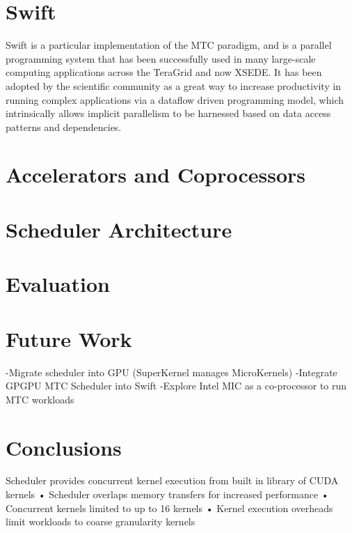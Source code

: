 \documentclass[conference]{IEEEtran}
\begin{document}
\section{Swift}
Swift is a particular implementation of the MTC paradigm, and is a parallel programming system that has been successfully used in many large-scale computing applications across the TeraGrid and now XSEDE. It has been adopted by the scientific community as a great way to increase productivity in running complex applications via a dataflow driven programming model, which intrinsically allows implicit parallelism to be harnessed based on data access patterns and dependencies.

\section{Accelerators and Coprocessors}

\section{Scheduler Architecture}

\section{Evaluation}

\section{Future Work}
-Migrate scheduler into GPU (SuperKernel manages MicroKernels)
-Integrate GPGPU MTC Scheduler into Swift
-Explore Intel MIC as a co-processor to run MTC 
workloads

\section{Conclusions}
Scheduler provides concurrent kernel execution from built in library of CUDA kernels • Scheduler overlaps memory transfers for increased performance • Concurrent kernels limited to up to 16 kernels • Kernel execution overheads limit workloads to coarse granularity kernels



\end{document}
